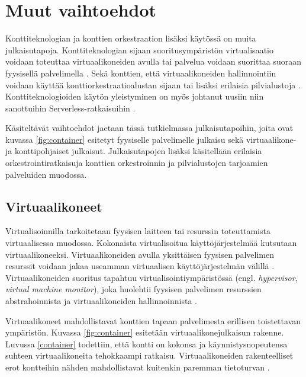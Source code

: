 \chapter{Muut vaihtoehdot\label{options}}

Konttiteknologian ja konttien orkestraation lisäksi käytössä on muita julkaisutapoja. Konttiteknologian sijaan suoritusympäristön virtualisaatio voidaan toteuttaa virtuaalikoneiden avulla tai palvelua voidaan suorittaa suoraan fyysisellä palvelimella \cite{Watada19}.
Sekä konttien, että virtuaalikoneiden hallinnointiin voidaan käyttää konttiorkestraatioalustan sijaan tai lisäksi erilaisia pilvialustoja \cite{Bousselmi14}.
Konttiteknologioiden käytön yleistyminen on myös johtanut uusiin niin sanottuihin Serverless-ratkaisuihin \cite{Baldini17}.

Käsiteltävät vaihtoehdot jaetaan tässä tutkielmassa julkaisutapoihin, joita ovat kuvassa \ref{fig:container} esitetyt fyysiselle palvelimelle julkaisu sekä virtuaalikone- ja konttipohjaiset julkaisut.
Julkaisutapojen lisäksi käsitellään erilaisia orkestrointiratkaisuja konttien orkestroinnin ja pilvialustojen tarjoamien palveluiden muodossa.

\section{Virtuaalikoneet}

Virtualisoinnilla tarkoitetaan fyysisen laitteen tai resurssin toteuttamista virtuaalisessa muodossa.
Kokonaista virtualisoitua käyttöjärjestelmää kutsutaan virtuaalikoneeksi.
Virtuaalikoneiden avulla yksittäisen fyysisen palvelimen resurssit voidaan jakaa useamman virtuaalisen käyttöjärjestelmän välillä \cite{Smith05}.
Virtuaalikoneiden suoritus tapahtuu virtualisointiympäristössä (engl. \textit{hypervisor}, \textit{virtual machine monitor}), joka huolehtii fyysisen palvelimen resurssien abstrahoinnista ja virtuaalikoneiden hallinnoinnista \cite{desai13}.

Virtuaalikoneet mahdollistavat konttien tapaan palvelimesta erillisen toistettavan ympäristön.
Kuvassa \ref{fig:container} esitetään virtuaalikonejulkaisun rakenne.
Luvussa \ref{container} todettiin, että kontti on kokonsa ja käynnistysnopeutensa suhteen virtuaalikoneita tehokkaampi ratkaisu.
Virtuaalikoneiden rakenteelliset erot kontteihin nähden mahdollistavat kuitenkin paremman tietoturvan \cite{Sultan19}.


